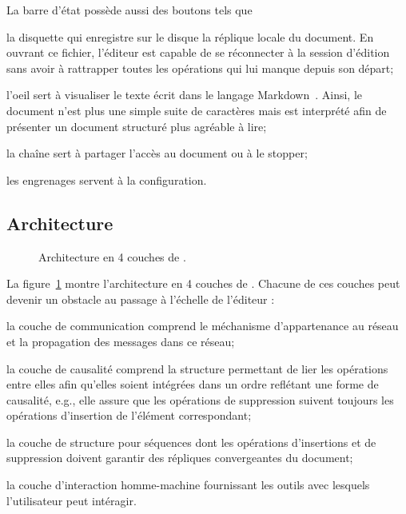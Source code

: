 La barre d'état possède aussi des boutons tels que
\begin{inparaenum}[(i)]
\item la disquette qui enregistre sur le disque la réplique locale du
  document. En ouvrant ce fichier, l'éditeur est capable de se réconnecter à la
  session d'édition sans avoir à rattrapper toutes les opérations qui lui manque
  depuis son départ;
\item l'oeil sert à visualiser le texte écrit dans le langage
  Markdown~\cite{markdown}. Ainsi, le document n'est plus une simple suite de
  caractères mais est interprété afin de présenter un document structuré plus
  agréable à lire;
\item la chaîne sert à partager l'accès au document ou à le stopper;
\item les engrenages servent à la configuration.
\end{inparaenum}


\subsection{Architecture}

\begin{figure}
  \begin{center}
    
    \caption{\label{editor:fig:architecture}Architecture en 4 couches de \CRATE.}
  \end{center}
\end{figure}

La figure~\ref{editor:fig:architecture} montre l'architecture en 4 couches de
\CRATE. Chacune de ces couches peut devenir un obstacle au passage à l'échelle
de l'éditeur :
\begin{inparaenum}[(i)]
\item la couche de communication comprend le méchanisme d'appartenance au réseau
  et la propagation des messages dans ce réseau;
\item la couche de causalité comprend la structure permettant de lier les
  opérations entre elles afin qu'elles soient intégrées dans un ordre reflétant
  une forme de causalité, e.g., elle assure que les opérations de suppression
  suivent toujours les opérations d'insertion de l'élément correspondant;
\item la couche de structure pour séquences dont les opérations d'insertions et
  de suppression doivent garantir des répliques convergeantes du document;
\item la couche d'interaction homme-machine fournissant les outils avec lesquels
  l'utilisateur peut intéragir.
\end{inparaenum}

